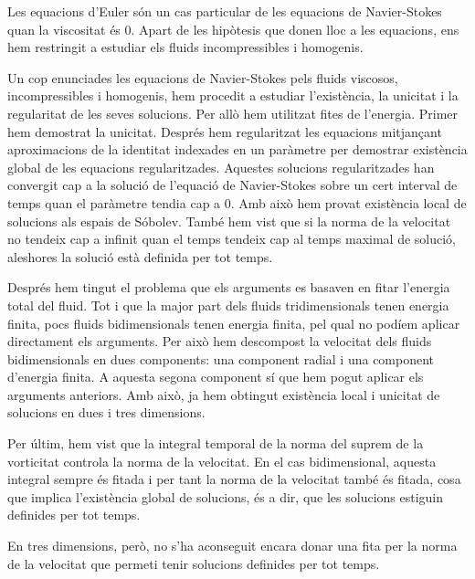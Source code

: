 \documentclass{article}
\numberwithin{equation}{section}
\begin{document}
Les equacions d'Euler s\'{o}n un cas particular de les equacions de Navier-Stokes quan la viscositat \'{e}s $0$. Apart de les hip\`{o}tesis que donen lloc a les equacions, ens hem restringit a estudiar els fluids incompressibles i homogenis.
\vspace{3mm}

Un cop enunciades les equacions de Navier-Stokes pels fluids viscosos, incompressibles i homogenis, hem procedit a estudiar l'exist\`{e}ncia, la unicitat i la regularitat de les seves solucions. Per all\`{o} hem utilitzat fites de l'energia. Primer hem demostrat la unicitat. Despr\'{e}s hem regularitzat les equacions mitjan\c{c}ant aproximacions de la identitat indexades en un par\`{a}metre per demostrar exist\`{e}ncia global de les equacions regularitzades. Aquestes solucions regularitzades han convergit cap a la soluci\'{o} de l'equaci\'{o} de Navier-Stokes sobre un cert interval de temps quan el par\`{a}metre tendia cap a $0$. Amb aix\`{o} hem provat exist\`{e}ncia local de solucions als espais de S\'{o}bolev. Tamb\'{e} hem vist que si la norma de la velocitat no tendeix cap a infinit quan el temps tendeix cap al temps maximal de soluci\'{o}, aleshores la soluci\'{o} est\`{a} definida per tot temps.
\vspace{3mm}

Despr\'{e}s hem tingut el problema que els arguments es basaven en fitar l'energia total del fluid. Tot i que la major part dels fluids tridimensionals tenen energia finita, pocs fluids bidimensionals tenen energia finita, pel qual no pod\'{i}em aplicar directament els arguments. Per aix\`{o} hem descompost la velocitat dels fluids bidimensionals en dues components: una component radial i una component d'energia finita. A aquesta segona component s\'{i} que hem pogut aplicar els arguments anteriors. Amb aix\`{o}, ja hem obtingut exist\`{e}ncia local i unicitat de solucions en dues i tres dimensions.

Per \'{u}ltim, hem vist que la integral temporal de la norma del suprem de la vorticitat controla la norma de la velocitat. En el cas bidimensional, aquesta integral sempre \'{e}s fitada i per tant la norma de la velocitat tamb\'{e} \'{e}s fitada, cosa que implica l'exist\`{e}ncia global de solucions, \'{e}s a dir, que les solucions estiguin definides per tot temps.

En tres dimensions, per\`{o}, no s'ha aconseguit encara donar una fita per la norma de la velocitat que permeti tenir solucions definides per tot temps.
\vspace{3mm}
\end{document}
